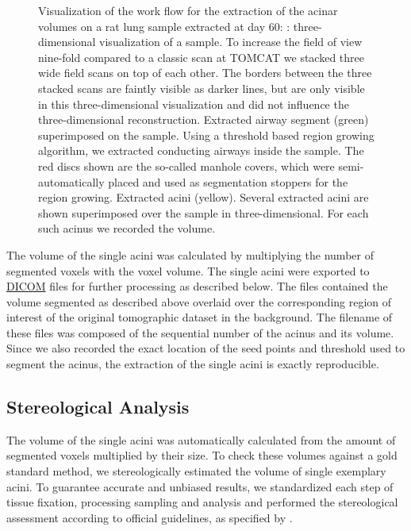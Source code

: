 \documentclass[twoside,paper=a4,abstract=true,english,DIV=calc]{scrartcl}
\newlength\imagescale		%
\begin{document}
\begin{figure}
{%
		\label{subfig:extracted acini}%
		}
	\caption{Visualization of the work flow for the extraction of the acinar volumes on a rat lung sample extracted at day 60: %
		\protect{}: three-dimensional visualization of a sample. To increase the field of view nine-fold compared to a classic scan at TOMCAT we stacked three wide field scans on top of each other. The borders between the three stacked scans are faintly visible as darker lines, but are only visible in this three-dimensional visualization and did not influence the three-dimensional reconstruction. %
		\protect{} Extracted airway segment (green) superimposed on the sample. Using a threshold based region growing algorithm, we extracted conducting airways inside the sample. The red discs shown are the so-called manhole covers, which were semi-automatically placed and used as segmentation stoppers for the region growing. %
		\protect{} Extracted acini (yellow). Several extracted acini are shown superimposed over the sample in three-dimensional. For each such acinus we recorded the volume.%
		}
	\label{fig:workflow}
\end{figure}

The volume of the single acini was calculated by multiplying the number of segmented voxels with the voxel volume. The single acini were exported to \href{https://secure.wikimedia.org/wikipedia/en/w/index.php?title=Digital_Imaging_and_Communications_in_Medicine&oldid=415023605}{DICOM} files for further processing as described below. The files contained the volume segmented as described above overlaid over the corresponding region of interest of the original tomographic dataset in the background. The filename of these files was composed of the sequential number of the acinus and its volume. Since we also recorded the exact location of the seed points and threshold used to segment the acinus, the extraction of the single acini is exactly reproducible.

\subsection{Stereological Analysis}
The volume of the single acini was automatically calculated from the amount of segmented voxels multiplied by their size. To check these volumes against a gold standard method, we stereologically estimated the volume of single exemplary acini. To guarantee accurate and unbiased results, we standardized each step of tissue fixation, processing sampling and analysis and performed the stereological assessment according to official guidelines, as specified by \citet{Hsia2010}.
\end{document}
